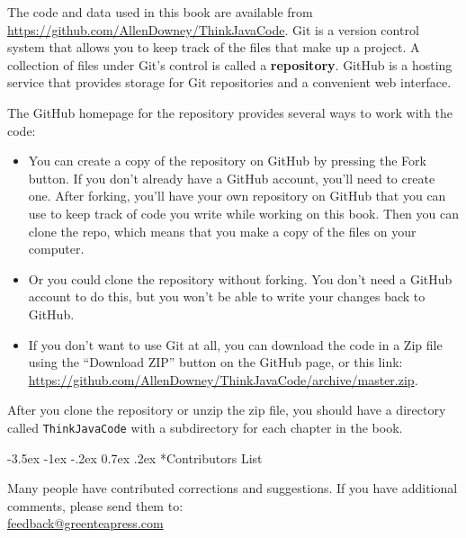 \documentclass[12pt]{book}
\makeatletter
\theoremstyle{exercise}
\renewcommand{\section}{\@startsection{section}{1}{\z@}%
    {-3.5ex \@plus -1ex \@minus -.2ex}%
    {0.7ex \@plus.2ex}%
    {\normalfont\Large\bfseries}}
\makeatother
\begin{document}
The code and data used in this book are available from \url{https://github.com/AllenDowney/ThinkJavaCode}.
Git is a version control system that allows you to keep track of the files that
make up a project.
A collection of files under Git's control is called a {\bf repository}.  GitHub is a hosting service that provides storage for Git repositories and a convenient web interface.


The GitHub homepage for the repository provides several ways to work with the code:

\begin{itemize}

\item You can create a copy of the repository on GitHub by pressing the {\sf Fork} button.
If you don't already have a GitHub account, you'll need to create one.
After forking, you'll have your own repository on GitHub that you can use to keep track of code you write while working on this book.
Then you can clone the repo, which means that you make a copy of the files on your computer.

\item Or you could clone the repository without forking.
You don't need a GitHub account to do this, but you won't be able to write your changes back to GitHub.

\item If you don't want to use Git at all, you can download the code in a Zip file using the ``Download ZIP'' button on the GitHub page, or this link: \url{https://github.com/AllenDowney/ThinkJavaCode/archive/master.zip}.

\end{itemize}

After you clone the repository or unzip the zip file, you should have a directory called {\tt ThinkJavaCode} with a subdirectory for each chapter in the book.


\section*{Contributors List}

Many people have contributed corrections and suggestions.
If you have additional comments, please send them to: \\
\href{mailto:feedback@greenteapress.com}{feedback@greenteapress.com}
\end{document}
